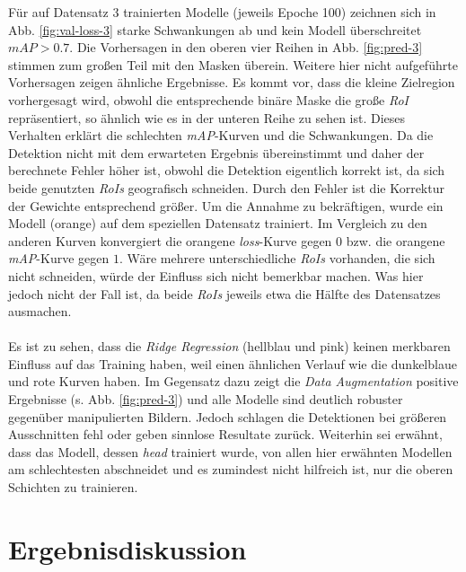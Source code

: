 Für auf Datensatz 3 trainierten Modelle (jeweils Epoche 100) zeichnen sich in  Abb. \ref{fig:val-loss-3} starke Schwankungen ab und kein Modell überschreitet $mAP>0.7$. Die Vorhersagen in den oberen vier Reihen in Abb. \ref{fig:pred-3} stimmen zum großen Teil mit den Masken überein. Weitere hier nicht aufgeführte Vorhersagen zeigen ähnliche Ergebnisse. Es kommt vor, dass die kleine Zielregion vorhergesagt wird, obwohl die entsprechende binäre Maske die große \textit{RoI} repräsentiert, so ähnlich wie es in der unteren Reihe zu sehen ist. Dieses Verhalten erklärt die schlechten \textit{mAP}-Kurven und die Schwankungen. Da die Detektion nicht mit dem erwarteten Ergebnis übereinstimmt und daher der berechnete Fehler höher ist, obwohl die Detektion eigentlich korrekt ist, da sich beide genutzten \textit{RoIs} geografisch schneiden. Durch den Fehler ist die Korrektur der Gewichte entsprechend größer. Um die Annahme zu bekräftigen, wurde ein Modell (orange) auf dem speziellen Datensatz trainiert. Im Vergleich zu den anderen Kurven konvergiert die orangene \textit{loss}-Kurve gegen $0$ bzw. die orangene \textit{mAP}-Kurve gegen $1$. Wäre mehrere unterschiedliche \textit{RoIs} vorhanden, die sich nicht schneiden, würde der Einfluss sich nicht bemerkbar machen. Was hier jedoch nicht der Fall ist, da beide \textit{RoIs} jeweils etwa die Hälfte des Datensatzes ausmachen.
\\\\
Es ist zu sehen, dass die \textit{Ridge Regression} (hellblau und pink) keinen merkbaren Einfluss auf das Training haben, weil einen ähnlichen Verlauf wie die dunkelblaue und rote Kurven haben. Im Gegensatz dazu zeigt die \textit{Data Augmentation} positive Ergebnisse (s. Abb. \ref{fig:pred-3}) und alle Modelle sind deutlich robuster gegenüber manipulierten Bildern. Jedoch schlagen die Detektionen bei größeren Ausschnitten fehl oder geben sinnlose Resultate zurück. Weiterhin sei erwähnt, dass das Modell, dessen \textit{head} trainiert wurde, von allen hier erwähnten Modellen am schlechtesten abschneidet und es zumindest nicht hilfreich ist, nur die oberen Schichten zu trainieren.

\chapter{Ergebnisdiskussion}


